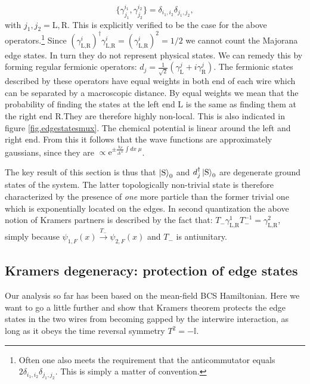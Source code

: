 \begin{equation}
\{\gamma^{i_1}_{j_1}, \gamma^{i_2}_{j_2} \} = \delta_{i_1,i_2}\delta_{j_1,j_2}, \nonumber
\end{equation}
with $j_1, j_2 = \text{L}, \text{R}$. This is explicitly verified to be the case for the above operators.\footnote{Often one also meets the requirement that the anticommutator equals $2\delta_{i_1,i_2}\delta_{j_1,j_2}$. This is simply a matter of convention.} Since $(\gamma^{i}_{\text{L,R}})^\dagger \gamma^{i}_{\text{L,R}} = (\gamma^{i}_{\text{L,R}})^2 = 1/2$ we cannot count the Majorana edge states. In turn they do not represent physical states. We can remedy this by forming regular fermionic operators: $d_j = \frac{1}{\sqrt{2}}(\gamma^{j}_{\text{L}} + i\gamma^{j}_{\text{R}})$. The fermionic states described by these operators have equal weights in both end of each wire which can be separated by a macroscopic distance. By equal weights we mean that the probability of finding the states at the left end L is the same as finding them at the right end R.They are therefore highly non-local. This is also indicated in figure \ref{fig.edgestatesmux}. The chemical potential is linear around the left and right end. From this it follows that the wave functions are approximately gaussians, since they are $\propto \text{e}^{\pm \frac{k_F}{\Delta^{11}}\int dx\; \mu}$. 

The key result of this section is thus that $\ket{\text{S}}_0$ and $d_j^\dagger\ket{\text{S}}_0$ are degenerate ground states of the system. The latter topologically non-trivial state is therefore characterized by the presence of \textit{one} more particle than the former trivial one which is exponentially located on the edges. In second quantization the above notion of Kramers partners is described by the fact that: $T_-\gamma^1_{\text{L,R}}T_-^{-1} = \gamma^2_{\text{L,R}}$, simply because $\psi_{1,F}(x) \overset{T_-}{\to} \psi_{2,F}(x)$ and $T_-$ is antiunitary.

\subsection{Kramers degeneracy: protection of edge states}
\label{sec.2wireskramersdegeneracy}
Our analysis so far has been based on the mean-field BCS Hamiltonian. Here we want to go a little further and show that Kramers theorem protects the edge states in the two wires from becoming gapped by the interwire interaction, as long as it obeys the time reversal symmetry $T^2 = -\mathbb{I}$. 

